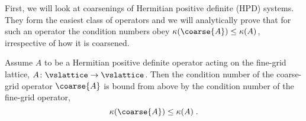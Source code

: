 First, we will look at coarsenings of Hermitian positive definite (HPD) systems.
They form the easiest class of operators and we will analytically prove that for such an operator the condition numbers obey $\kappa(\coarse{A}) \leq \kappa(A)$, irrespective of how it is coarsened.

\begin{theorem} \label{thm:cond:hpd}
Assume $A$ to be a Hermitian positive definite operator acting on the fine-grid lattice, $A \colon \vslattice \rightarrow \vslattice$. Then the condition number of the coarse-grid operator $\coarse{A}$ is bound from above by the condition number of the fine-grid operator,
\begin{equation}
\kappa(\coarse{A}) \leq \kappa(A) \;.
\end{equation}
\end{theorem}

